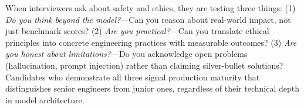 \begin{keyinsight}
When interviewers ask about safety and ethics, they are testing three things:
(1) \emph{Do you think beyond the model?}---Can you reason about real-world
impact, not just benchmark scores?  (2) \emph{Are you practical?}---Can you
translate ethical principles into concrete engineering practices with
measurable outcomes?  (3) \emph{Are you honest about limitations?}---Do you
acknowledge open problems (hallucination, prompt injection) rather than
claiming silver-bullet solutions?  Candidates who demonstrate all three
signal production maturity that distinguishes senior engineers from
junior ones, regardless of their technical depth in model architecture.
\end{keyinsight}

